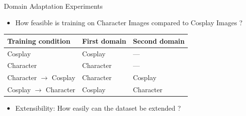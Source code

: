 \documentclass[aspectratio=169]{beamer}
\begin{document}
\begin{frame}{Domain Adaptation Experiments}
    \begin{itemize}
        \item How feasible is training on Character Images compared to Cosplay Images ?
    \end{itemize}
    \begin{table}[htbp]
        \centering
        \label{tab:transfer-conditions}
        \begin{tabular}{lll}
            \toprule
            Training condition & First domain & Second domain \\
            \midrule
            Cosplay                         & Cosplay   & ---       \\
            Character                       & Character & ---       \\
            Character $\rightarrow$ Cosplay & Character & Cosplay   \\
            Cosplay $\rightarrow$ Character & Cosplay   & Character \\
            \bottomrule
        \end{tabular}
    \end{table}

    \begin{itemize}
        \item Extensibility: How easily can the dataset be extended ? %
    \end{itemize}
\end{frame}


\end{document}
